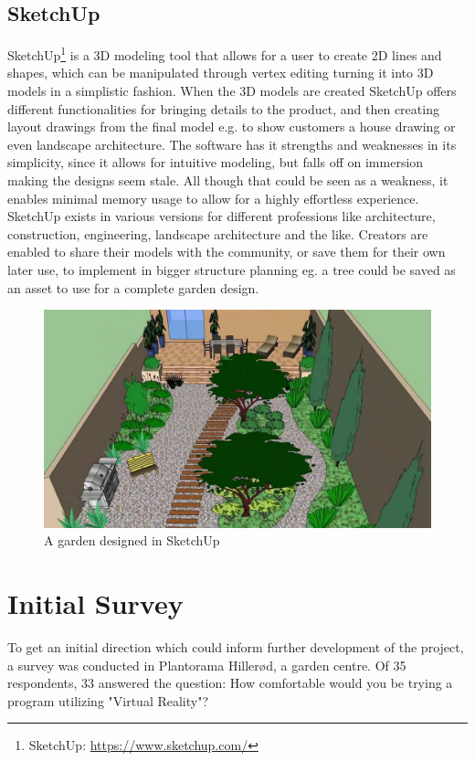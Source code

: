 		
		\subsection{SketchUp}
			SketchUp\footnote{SketchUp: \url{https://www.sketchup.com/}} is a 3D modeling tool that allows for a user to create 2D lines and shapes, which can be manipulated through vertex editing turning it into 3D models in a simplistic fashion. When the 3D models are created SketchUp offers different functionalities for bringing details to the product, and then creating layout drawings from the final	model e.g. to show customers a house drawing or even landscape architecture. The software has it strengths and weaknesses in its simplicity, since it allows for intuitive modeling, but falls off on immersion making the designs seem stale. All though that could be seen as a weakness, it enables minimal memory usage to allow for a highly effortless experience. \\
			
			SketchUp exists in various versions for different professions like architecture, construction, engineering, landscape architecture and the like. Creators are enabled to share their models with the community, or save them for their own later use, to implement in bigger structure planning eg. a tree could be saved as an asset to use for a complete garden design.
			
				\begin{figure}[H]
					\centering
					\includegraphics[width=0.6\linewidth]{figure/Analysis/sketchupgarden}
					\caption{A garden designed in SketchUp}
					\label{fig:sketchupgarden}
				\end{figure}
			
			\section{Initial Survey}
			
			To get an initial direction which could inform further development of the project, a survey was conducted in Plantorama Hillerød, a garden centre. Of 35 respondents, 33 answered the question: How comfortable would you be trying a program utilizing "Virtual Reality"?
			
